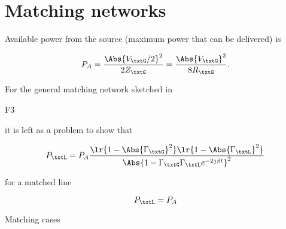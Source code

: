 %
%

\section{Matching networks}

Available power from the source (maximum power that can be delivered) is

\begin{dmath}\label{eqn:uwavesDeck6LCmatchingCore:20}
P_A
= \frac{\Abs{V_\txtG/2}^2}{2 Z_\txtG}
= \frac{\Abs{V_\txtG}^2}{8 R_\txtG}.
\end{dmath}

For the general matching network sketched in

F3

it is left as a problem to show that

\begin{dmath}\label{eqn:uwavesDeck6LCmatchingCore:40}
P_\txtL = P_A \frac{
\lr{ 1 - \Abs{\Gamma_\txtG}^2 }
\lr{ 1 - \Abs{\Gamma_\txtL}^2 } }
{
\Abs{ 1 - \Gamma_\txtG \Gamma_\txtL e^{-2 j \beta l } }^2
}
\end{dmath}

for a matched line

\begin{dmath}\label{eqn:uwavesDeck6LCmatchingCore:60}
P_\txtL = P_A
\end{dmath}

Matching cases

